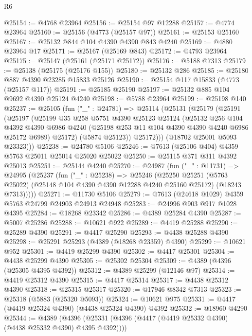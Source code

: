 \begin{lexlean}{R6}
\begin{coremodule}
@25154 := @4768 @23964
@25156 := @25154 @97 @12288
@25157 := @4774 @23964
@25160 := @25156 (@4773 (@25157 @97))
@25161 := @25153 @25160
@25167 := @25132 @844 @104 @4390 @4390 @843 @4240
@25169 := @4880 @23964 @17
@25171 := @25167 (@25169 @843)
@25172 := @4793 @23964
@25175 := @25147 (@25161 (@25171 @25172))
@25176 := @5188 @7313
@25179 := @25138 (@25175 (@25176 @155))
@25180 := @25132 @286
@25185 := @25180 @887 @4390 @23285 @15833 @25126
@25190 := @25154 @117 @15833 (@4773 (@25157 @117))
@25191 := @25185 @25190
@25197 := @25132 @885 @104 @9692 @4390 @25124 @4240
@25198 := @5788 @23964
@25199 := @25198 @140
@25237 := @25105
    (fun ("_" : @24781) =>
    @25114
      (@25131
        (@25179
          (@25191
            (@25197
              (@25199
                @35
                @258
                @5751
                @4390
                @25123
                @25124
                (@25132
                  @256
                  @104
                  @4392
                  @4390
                  @6986
                  @4240
                  (@25198 @253 @11 @104 @4390 @4390 @4240 @6986 @25172 @6989)
                  @25172)
                (@5874 @25123))
              @25172)))
        (@18702 @25001 @5093 @23323)))
@25238 := @24780 @5106
@25246 := @7613 (@25106 @404) @4359 @5763 @25011 @25014 @25020 @25022
@25250 := @25115 @371 @311 @4392 @25013
@25251 := @25144 @4240
@25270 := @24987
    (fun ("_" : @11731) =>
    @24995
      (@25237
        (fun ("_" : @25238) =>
        @25246
          (@25250
            @25251
            (@5763 @25022)
            (@25148 @104 @4390 @4390 @12288 @4240 @25160 @25172)
            (@18243 @7313)))))
@25271 := @11730 @5106
@25279 := @7613 (@24618 @1029) @4359 @5763 @24799 @24903 @24913 @24948
@25283 := @24996 @903 @917 @1028 @4395
@25284 := @18268 @23342
@25286 := @4389 @25284 @4390
@25287 := @5007 @25286
@25288 := @10621 @922
@25289 := @4419 @25288
@25290 := @25289 @4390
@25291 := @4417 @25290
@25293 := @4438 @25288 @4390
@25298 := @25291 @25293 (@4389 (@18268 @23359) @4390)
@25299 := @10621 @952
@25301 := @4419 @25299 @4390
@25302 := @4417 @25301
@25304 := @4438 @25299 @4390
@25305 := @25302 @25304
@25309 := @4389 (@4396 (@25305 @4395 @4392))
@25312 := @4389 @25299 (@12146 @97)
@25314 := @4419 @25312 @4390
@25315 := @4417 @25314
@25317 := @4438 @25312 @4390
@25318 := @25315 @25317
@25320 := @17946 @8342 @7313
@25323 := @25318 (@5883 (@25320 @5093))
@25324 := @10621 @975
@25331 := @4417 (@4419 @25324 @4390) (@4438 @25324 @4390) @4392
@25332 := @18960 @4290
@25344 := @4389
    (@4396 (@25331 (@4396 (@4417 (@4419 @25332 @4390) (@4438 @25332 @4390) @4395 @4392))))

\end{coremodule}
\end{lexlean}
